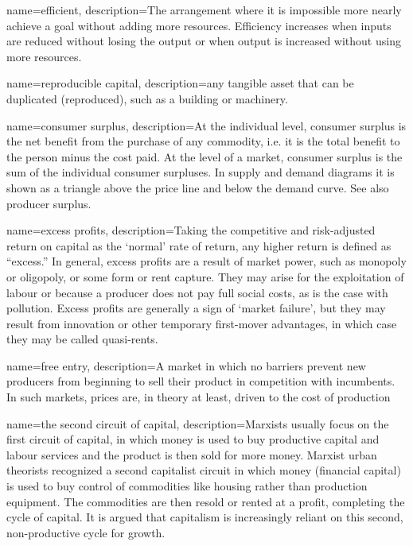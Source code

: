 {
name=efficient,
description={The arrangement where it is impossible more nearly achieve a goal without adding more resources. Efficiency increases when inputs are reduced without losing the output or when output is increased without using more resources.}
}

{
name=reproducible capital,
description={any tangible asset that can be duplicated (reproduced), such as a building or machinery.}
}


{
name=consumer surplus,
description={At the individual level, consumer surplus is the net benefit from the purchase of any commodity, i.e. it is the total benefit to the person minus the cost paid. At the level of a market, consumer surplus is the sum of the individual consumer surpluses. In supply and demand diagrams it is shown as a triangle above the price line and below the demand curve. See also \gls{producer surplus}.}
}

{
name=excess profits,
description={Taking the competitive and risk-adjusted return on capital as the `normal' rate of return, any higher return is defined as ``excess.'' In general, excess profits are a result of market power, such as monopoly or oligopoly, or some form or rent capture. They may arise for the exploitation of labour or because a producer does not pay full social costs, as is the case with pollution. Excess profits are generally a sign of `market failure', but they may result from innovation or other temporary first-mover advantages, in which case they may be called \gls{quasi-rents}.}
}

{
name=free entry,
description={A market in which no barriers prevent new producers from beginning to sell their product in competition with incumbents. In such markets, prices are, in theory at least, driven to the cost of production }
}

{
name=the second circuit of capital,
description={Marxists usually focus on the first circuit of capital, in which money is used to buy productive capital and labour services and the product is then sold for more money. Marxist urban theorists recognized a second capitalist circuit in which money (financial capital) is used to buy control of commodities like housing rather than production equipment. The commodities are then resold or rented at a profit, completing the cycle of capital. It is argued that capitalism is increasingly reliant on this second, non-productive cycle for growth. }
}

